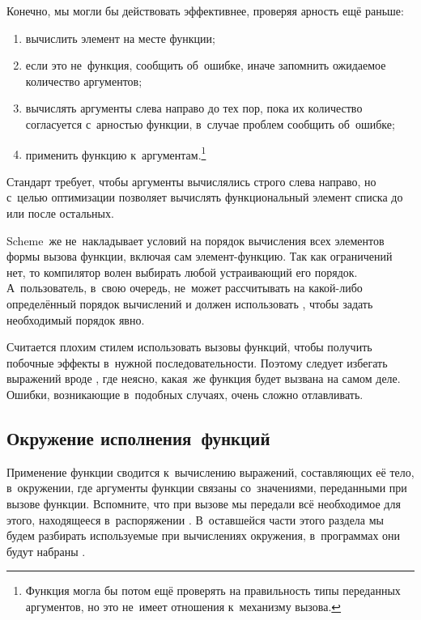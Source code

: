 Конечно, мы могли бы действовать эффективнее, проверяя арность ещё раньше:

\begin{enumerate}
  \item вычислить элемент на месте функции;
  
  \item если это не~функция, сообщить об~ошибке, иначе запомнить ожидаемое
        количество аргументов;
  
  \item вычислять аргументы слева направо до тех пор, пока их количество
        согласуется с~арностью функции, в~случае проблем сообщить об~ошибке;
  
  \item применить функцию к~аргументам.\footnote*{Функция могла бы потом
        ещё проверять на правильность типы переданных аргументов, но это
        не~имеет отношения к~механизму вызова.}
\end{enumerate}

Стандарт {\CommonLisp} требует, чтобы аргументы вычислялись строго слева
направо, но с~целью оптимизации позволяет вычислять функциональный элемент
списка до или после остальных.

Scheme~же не~накладывает условий на порядок вычисления всех элементов формы
вызова функции, включая сам элемент-функцию. Так как ограничений нет, то
компилятор волен выбирать любой устраивающий его порядок.
 А~пользователь, в~свою очередь, не~может
рассчитывать на какой-либо определённый порядок вычислений и должен использовать
, чтобы задать необходимый порядок явно.

Считается плохим стилем использовать вызовы функций, чтобы получить побочные
эффекты в~нужной последовательности. Поэтому следует избегать выражений вроде
, где неясно, какая~же функция будет
вызвана на самом деле. Ошибки, возникающие в~подобных случаях, очень сложно
отлавливать.


\subsection*{Окружение исполнения~функций}

Применение функции сводится к~вычислению выражений, составляющих её тело,
в~окружении, где аргументы функции связаны со~значениями, переданными при вызове
функции. Вспомните, что при вызове  мы передали всё
необходимое для этого, находящееся в~распоряжении . В~оставшейся
части этого раздела мы будем разбирать используемые при вычислениях окружения,
в~программах они будут набраны .


